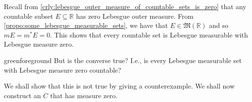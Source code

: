 \documentclass[notoc,notitlepage]{tufte-book}
\begin{document}
Recall from \cref{crly:lebesgue_outer_measure_of_countable_sets_is_zero} that
any countable subset $E \subseteq \mathbb{R}$ has zero Lebesgue outer measure.
From \cref{propo:some_lebesgue_measurable_sets}, we have that $E \in
\mathfrak{M}(\mathbb{R})$ and so $m E = m^* E = 0$. This shows that every
countable set is Lebesgue measurable with Lebesgue measure zero.

\begin{quotebox}{green}{foreground}
  But is the converse true? I.e., is every Lebesgue measurable set with Lebesgue
  measure zero countable?
\end{quotebox}

We shall show that this is not true by giving a counterexample. We shall now
construct an  $C$ that has measure zero.
\end{document}
